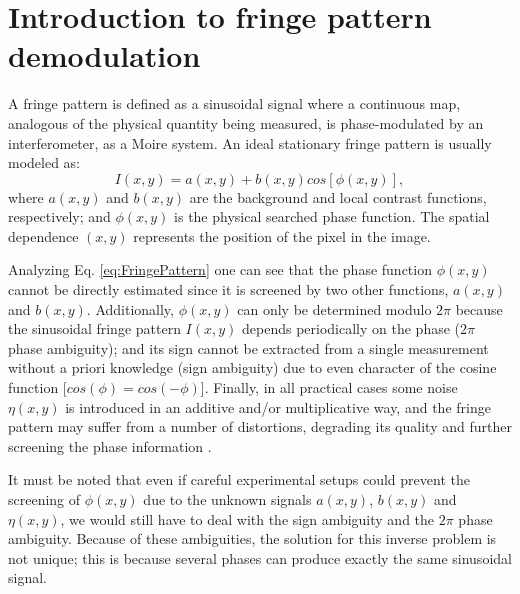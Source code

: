 \chapter{Introduction to fringe pattern demodulation}


A fringe pattern is defined as a sinusoidal signal where a continuous map, 
analogous of the physical quantity being measured, is phase-modulated by an 
interferometer, as a Moire system. An ideal stationary fringe pattern is usually
modeled as:
\begin{equation}\label{eq:FringePattern}
I(x,y)=a(x,y)+b(x,y)cos[\phi(x,y)],
\end{equation}
where $a(x,y)$ and $b(x,y)$ are the background and local contrast functions,
respectively; and $\phi(x,y)$ is the physical searched phase function. The spatial
dependence $(x,y)$ represents the position of the pixel in the image.

Analyzing Eq. \eqref{eq:FringePattern} one can see that the phase function
$\phi(x,y)$ cannot be directly estimated since it is screened by two other
functions, $a(x,y)$ and $b(x,y)$. Additionally, $\phi(x,y)$ can only be
determined modulo $2\pi$ because the sinusoidal fringe pattern $I(x,y)$ depends
periodically on the phase ($2\pi$ phase ambiguity); and its sign cannot be 
extracted from a single measurement without a priori knowledge (sign ambiguity)
due to even character of the cosine function [$cos(\phi)=cos(-\phi)$]. Finally, 
in all practical cases some noise $\eta(x,y)$ is introduced in an additive and/or
multiplicative way, and the fringe pattern may suffer from a number of distortions,
degrading its quality and further screening the phase information 
\cite{Schwider:83,Creath:91}.

It must be noted that even if careful experimental setups could prevent the
screening of $\phi(x,y)$ due to the unknown signals $a(x,y)$, $b(x,y)$ and $\eta
(x,y)$, we would still have to deal with the sign ambiguity and the $2\pi$ phase
ambiguity. Because of these ambiguities, the solution for this inverse problem is
not unique; this is because several phases can produce exactly the same sinusoidal
signal.

